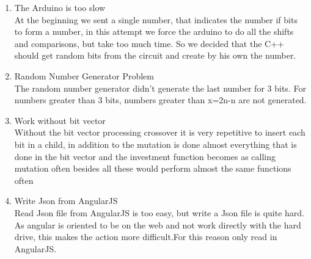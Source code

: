 \documentclass[twocolumn]{IEEEtran}
\begin{document}
\begin{enumerate}
	\item The Arduino is too slow\\
    At the beginning we sent a single number, that indicates the number if bits to form a number, in 
    this attempt we force the arduino to do all the shifts and comparisons, but take too much time. So we decided that the C++ should get random bits from the circuit and create by his own the number.
    
    \item Random Number Generator Problem\\
    The random number generator didn't generate the last number for 3 bits. For numbers greater than 3 bits, numbers greater than x=2n-n are not generated.
    
    \item Work without bit vector\\
    
    Without the bit vector processing crossover it is very repetitive to insert each bit in a child, in addition to the mutation is done almost everything that is done in the bit vector and the investment function becomes as calling mutation often besides all these would perform almost the same functions often
    
     \item Write Json from AngularJS\\
    Read Json file from AngularJS is too easy, but write a Json file is quite hard. As angular is oriented to be on the web and not work directly with the hard drive, this makes the action more difficult.For this reason only read in AngularJS. 
	
\end{enumerate}
\end{document}
